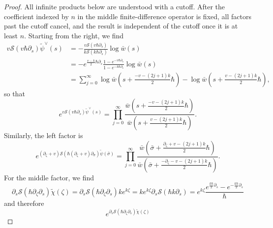 \documentclass[10pt,a4paper,oneside,no-math,reqno]{amsart}%
\theoremstyle{plain}
\theoremstyle{definition}
\theoremstyle{remark}
\numberwithin{equation}{section}
\newcommand{\mc}[1]{\mathcal{#1}}
\newcommand{\1}{\mathds{1}}
\newcommand{\<}{\langle}
\renewcommand{\>}{\rangle}
\newcommand{\del}{\partial}
\begin{document}
\begin{proof}
	All infinite products below are understood with a cutoff. After the coefficient indexed by $n$ in the middle finite-difference operator is fixed, all factors past the cutoff cancel, and the result is independent of the cutoff once it is at least $n$.
	Starting from the right, we find
	\begin{equation}
		\begin{split}
			v \mc{S}(v \hbar \del_s ) \tilde{\psi}^\vee (s)
			&=
			- \frac{v \mc{S}(v \hbar \del_s )}{k \mc{S}( k \hbar \del_s )} \log \bar{w} (s)
			\\
			&=
			- e^{\frac{v-k}{2} \hbar \del_s} \frac{1 - e^{-v \hbar \del_s }}{1 - e^{-k \hbar \del_s }} \log \bar{w} (s)
			\\
			&=
			\sum_{j = 0}^ \infty \log \bar{w} (s + \frac{-v- (2j + 1) k}{2} \hbar) -\log \bar{w} (s + \frac{v- (2j + 1) k}{2} \hbar) ,
		\end{split}
	\end{equation}
	so that
	\begin{equation}
		e^{v \mc{S}(v \hbar \del_s) \tilde{\psi}^\vee (s)}
		=
		\prod_{j = 0}^ \infty  \frac{\bar{w} (s + \frac{-v- (2j + 1) k}{2} \hbar)}{\bar{w} (s + \frac{v- (2j + 1) k}{2} \hbar)} .
	\end{equation}
	Similarly, the left factor is
	\begin{equation}
		e^{ (\del_\zeta+v) \mc{S}( \hbar (\del_\zeta + v) \del_{\bar{\sigma}} )\tilde{\psi} (\bar{\sigma}) }
		=
		\prod_{j = 0}^ \infty  \frac{\bar{w} ( \bar{\sigma} + \frac{\del_\zeta + v- (2j + 1) k}{2} \hbar)}{\bar{w} ( \bar{\sigma} + \frac{- \del_\zeta -v- (2j + 1) k}{2} \hbar)} .
	\end{equation}
	For the middle factor, we find
	\begin{equation}
		\del_s \mc{S}( \hbar \del_\zeta \del_s ) \tilde{\chi} (\zeta )
		=
		\del_s \mc{S}( \hbar \del_\zeta \del_s) k e^{k\zeta}
		=
		k e^{k\zeta} \del_s \mc{S}( \hbar k \del_s)
		=
		e^{k\zeta}  \frac{e^{\frac{k \hbar}{2} \del_s} - e^{- \frac{k\hbar}{2} \del_s}}{\hbar}
	\end{equation}
	and therefore
	\begin{equation}
		e^{\del_s \mc{S}( \hbar \del_\zeta \del_s)\tilde{\chi} (\zeta)}

\end{equation}
\end{proof}
\end{document}

